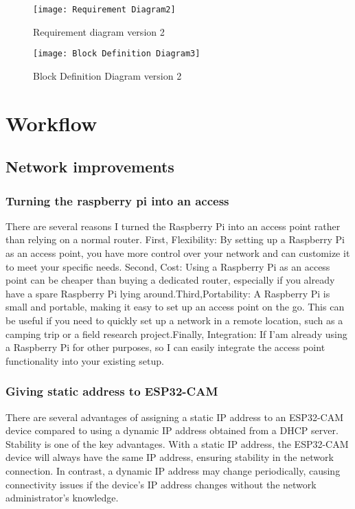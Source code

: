\FloatBarrier

\FloatBarrier
\begin{figure}[h]
\FloatBarrier
         \centering
        \texttt{[image: Requirement Diagram2]}
   
        \caption{Requirement diagram version 2}
        \label{Requirement diagram version 2}
\FloatBarrier
    \end{figure}


\FloatBarrier
\FloatBarrier
\begin{figure}[h]
\FloatBarrier
         \centering
        \texttt{[image: Block Definition Diagram3]}
   
        \caption{Block Definition Diagram version 2}
        \label{Block Definition Diagram version 2}
\FloatBarrier
    \end{figure}


\FloatBarrier
\section{Workflow}
\subsection{Network improvements}
\subsubsection{Turning the raspberry pi into an access}
There are several reasons I turned the Raspberry Pi into an access point rather than relying on a normal router. First, Flexibility: By setting up a Raspberry Pi as an access point, you have more control over your network and can customize it to meet your specific needs. Second, Cost: Using a Raspberry Pi as an access point can be cheaper than buying a dedicated router, especially if you already have a spare Raspberry Pi lying around.Third,Portability: A Raspberry Pi is small and portable, making it easy to set up an access point on the go. This can be useful if you need to quickly set up a network in a remote location, such as a camping trip or a field research project.Finally, Integration: If I'am already using a Raspberry Pi for other purposes, so I can easily integrate the access point functionality into your existing setup.
\subsubsection{Giving static address to ESP32-CAM}
There are several advantages of assigning a static IP address to an ESP32-CAM device compared to using a dynamic IP address obtained from a DHCP server. Stability is one of the key advantages. With a static IP address, the ESP32-CAM device will always have the same IP address, ensuring stability in the network connection. In contrast, a dynamic IP address may change periodically, causing connectivity issues if the device's IP address changes without the network administrator's knowledge.

